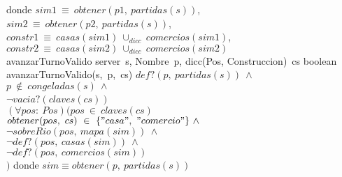 \begin{Interfaz}
\tab donde $sim1\ \equiv\ obtener(p1,\ partidas(s))$, \\
\tab\tab\tab \: $sim2\ \equiv\ obtener(p2,\ partidas(s))$, \\
\tab\tab\tab \: $constr1\ \equiv\ casas(sim1)\ \cup_{dicc}\ comercios(sim1)$, \\
\tab\tab\tab \: $constr2\ \equiv\ casas(sim2)\ \cup_{dicc}\ comercios(sim2)$
\\

\tadOperacion
    {avanzarTurnoValido}
    {server\ s, Nombre\ p, dicc(Pos, Construccion)\ cs}
    {boolean}
    {}
\tadAxioma
    {avanzarTurnoValido(s,\ p,\ cs)}
    {$
        def?(p,\ partidas(s))\ \land\ $\\$
        p\ \notin\ congeladas(s)\ \land\ $\\$ 
        \neg vacia?(claves(cs))\ $\yluego\ \\$
        (\forall pos:\ Pos)(pos\ \in\ claves(cs)\ $\impluego$ $\\$
            $\tab$ obtener(pos,\ cs)\ \in\ \{"casa",\ "comercio"\}\ \land\ $\\$
            $\tab$ \neg sobreRio(pos,\ mapa(sim))\ \land\ $\\$
            $\tab$ \neg def?(pos,\ casas(sim))\ \land\ $\\$
            $\tab$ \neg def?(pos,\ comercios(sim)) $\\$
        )
    $}
\tab donde $sim \equiv obtener(p,\ partidas(s))$  
\\




\end{Interfaz}
